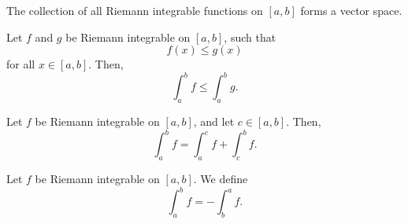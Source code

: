 \documentclass[11pt]{article}
\theoremstyle{definition}
\theoremstyle{remark}
\numberwithin{equation}{module}
\begin{document}
    \begin{theorem}
        The collection of all Riemann integrable functions on $[a, b]$ forms a
        vector space.
    \end{theorem}

    \begin{theorem}
        Let $f$ and $g$ be Riemann integrable on $[a, b]$, such that \[
            f(x) \leq g(x)
        \] for all $x \in [a, b]$. Then, \[
            \int_a^b f \leq \int_a^b g.
        \] 
    \end{theorem}

    \begin{theorem}
        Let $f$ be Riemann integrable on $[a, b]$, and let $c \in [a, b]$. Then, \[
            \int_a^b f = \int_a^c f + \int_c^b f.
        \] 
    \end{theorem}

    \begin{definition}
        Let $f$ be Riemann integrable on $[a, b]$. We define \[
            \int_a^b f = -\int_b^a f.
        \] 
    \end{definition}
\end{document}
